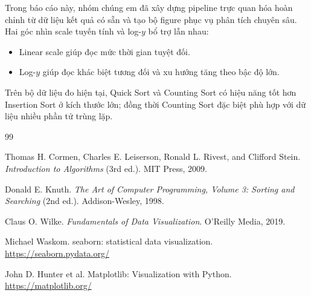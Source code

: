 Trong báo cáo này, nhóm chúng em đã xây dựng pipeline trực quan hóa hoàn chỉnh từ dữ liệu kết quả có sẵn và tạo bộ figure phục vụ phân tích chuyên sâu.
Hai góc nhìn scale tuyến tính và log-$y$ bổ trợ lẫn nhau:
\begin{itemize}[leftmargin=1.2cm]
    \item Linear scale giúp đọc mức thời gian tuyệt đối.
    \item Log-$y$ giúp đọc khác biệt tương đối và xu hướng tăng theo bậc độ lớn.
\end{itemize}

Trên bộ dữ liệu đo hiện tại, Quick Sort và Counting Sort có hiệu năng tốt hơn Insertion Sort ở kích thước lớn;
đồng thời Counting Sort đặc biệt phù hợp với dữ liệu nhiều phần tử trùng lặp.

\newpage
{}
\begin{thebibliography}{99}

Thomas H. Cormen, Charles E. Leiserson, Ronald L. Rivest, and Clifford Stein.
\newblock \textit{Introduction to Algorithms} (3rd ed.).
\newblock MIT Press, 2009.

Donald E. Knuth.
\newblock \textit{The Art of Computer Programming, Volume 3: Sorting and Searching} (2nd ed.).
\newblock Addison-Wesley, 1998.

Claus O. Wilke.
\newblock \textit{Fundamentals of Data Visualization}.
\newblock O'Reilly Media, 2019.

Michael Waskom.
\newblock seaborn: statistical data visualization.
\newblock \url{https://seaborn.pydata.org/}

John D. Hunter et al.
\newblock Matplotlib: Visualization with Python.
\newblock \url{https://matplotlib.org/}

\end{thebibliography}
